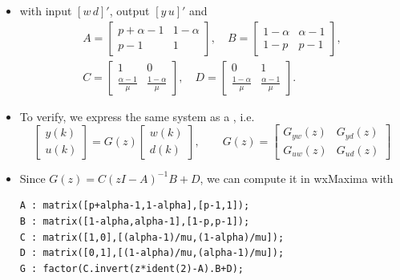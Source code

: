 \begin{frame}
\begin{itemize}[<+-| alert@+>]
 \item[] with input $[w\,d]'$, output $[y\,u]'$ and
       \begin{displaymath}
        \begin{array}{c}
         A = \begin{bmatrix} p+\alpha-1 & 1-\alpha \\ p-1 & 1  \end{bmatrix},\quad
         B = \begin{bmatrix} 1-\alpha & \alpha-1 \\ 1-p & p-1  \end{bmatrix},\\
         C = \begin{bmatrix} 1 & 0 \\ \frac{\alpha-1}{\mu} & \frac{1-\alpha}{\mu} \end{bmatrix},\quad
         D = \begin{bmatrix} 0 & 1 \\ \frac{1-\alpha}{\mu} & \frac{\alpha-1}{\mu} \end{bmatrix}.
        \end{array}
       \end{displaymath}
 \end{itemize}
\end{frame}

\begin{frame}[fragile]
\myPause
 \begin{itemize}[<+-| alert@+>]
 \item To verify, we express the same system as a , i.e.
       \begin{displaymath}
        \begin{bmatrix} y(k) \\ u(k) \end{bmatrix}
        = G(z) 
        \begin{bmatrix} w(k) \\ d(k) \end{bmatrix}, \qquad
        G(z) =
        \begin{bmatrix} G_{yw}(z) & G_{yd}(z) \\ G_{uw}(z) & G_{ud}(z) \end{bmatrix}
       \end{displaymath}
 \item Since $G(z) = C(zI-A)^{-1}B+D$, we can compute it in wxMaxima with 
       \begin{verbatim}
A : matrix([p+alpha-1,1-alpha],[p-1,1]);
B : matrix([1-alpha,alpha-1],[1-p,p-1]);
C : matrix([1,0],[(alpha-1)/mu,(1-alpha)/mu]);
D : matrix([0,1],[(1-alpha)/mu,(alpha-1)/mu]);
G : factor(C.invert(z*ident(2)-A).B+D);
       \end{verbatim}
 \end{itemize}
\end{frame}

